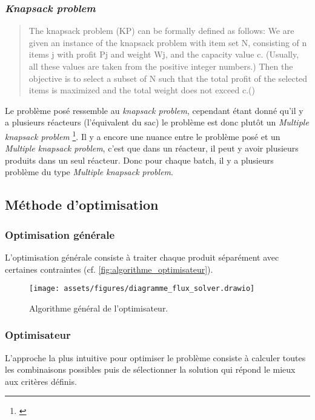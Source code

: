 \subsubsection{\textit{Knapsack problem}}
\begin{quotation}
    \og The knapsack problem (KP) can be formally defined as follows: We are given an
    instance of the knapsack problem with item set N, consisting of n items j with profit
    Pj and weight Wj, and the capacity value c. (Usually, all these values are taken from
    the positive integer numbers.) Then the objective is to select a subset of N such
    that the total profit of the selected items is maximized and the total weight does not
    exceed c.\fg (\cite[p. 2]{KnapsackProblemsBook})
\end{quotation}
Le problème posé ressemble au \textit{knapsack problem}, cependant étant donné qu'il y a plusieurs réacteurs (l'équivalent du sac) le problème est donc plutôt un \textit{Multiple knapsack problem} \footnote{\parencite[p. 285]{KnapsackProblemsBook}}. Il y a encore une nuance entre le problème posé et un \textit{Multiple knapsack problem}, c'est que dans un réacteur, il peut y avoir plusieurs produits dans un seul réacteur. Donc pour chaque batch, il y a plusieurs problème du type \textit{Multiple knapsack problem}.
\subsection{Méthode d'optimisation}
\subsubsection{Optimisation générale}
L'optimisation générale consiste à traiter chaque produit séparément avec certaines contraintes (cf. \autoref{fig:algorithme_optimisateur}).
\begin{figure}[H]
    \centering
    \texttt{[image: assets/figures/diagramme\_flux\_solver.drawio]}
    \caption{Algorithme général de l'optimisateur.}
    \label{fig:algorithme_optimisateur}
\end{figure}

\subsubsection{Optimisateur}
L'approche la plus intuitive pour optimiser le problème consiste à calculer toutes les combinaisons possibles puis de sélectionner la solution qui répond le mieux aux critères définis.

